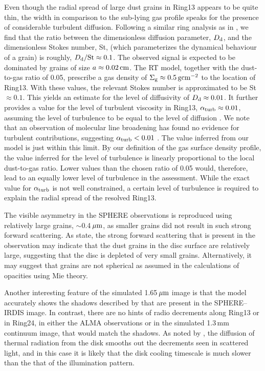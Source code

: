 \documentclass[fleqn,usenatbib,useAMS]{mnras}
\begin{document}
Even though the radial spread of large dust grains in Ring13 appears to be quite thin, the width in comparison to the sub-lying gas profile speaks for the presence of considerable turbulent diffusion. Following a similar ring analysis as in \citet{2018ApJ...869L..46D}, we find that the ratio between the dimensionless diffusion parameter, $D_{\rm d}$, and the dimensionless Stokes number, St, (which parameterizes the dynamical behaviour of a grain) is roughly, $D_{\rm d}/{\rm St}\approx 0.1$. The observed signal is expected to be dominated by grains of size $a\approx 0.02\,{\rm cm}$. The RT model, together with the dust-to-gas ratio of 0.05, prescribe a gas density of $\Sigma_{\rm g} \approx 0.5\,{\rm g}{\rm cm}^{-2}$ to the location of Ring13. With these values, the relevant Stokes number is approximated to be St$\approx 0.1$. This yields an estimate for the level of diffusivity of $D_{\rm d}\approx 0.01$. It further provides a value for the level of turbulent viscosity in Ring13, $\alpha_{\rm turb}\approx 0.01$, assuming the level of turbulence to be equal to the level of diffusion \citep{2007Icar..192..588Y}. We note that an observation of molecular line broadening has found no evidence for turbulent contributions, suggesting $\alpha_{\rm turb}<0.01$ \citep{Flaherty_2020}. The value inferred from our model is just within this limit. By our definition of the gas surface density profile, the value inferred for the level of turbulence is linearly proportional to the local dust-to-gas ratio. Lower values than the chosen ratio of 0.05 would, therefore, lead to an equally lower level of turbulence in the assessment. While the exact value for $\alpha_{\rm turb}$ is not well constrained, a certain level of turbulence is required to explain the radial spread of the resolved Ring13.

The visible asymmetry in the SPHERE observations is reproduced using relatively large grains, $\sim$0.4\,$\hbox{$\mu$m}$, as smaller grains did not result in such strong forward scattering. As \citet{refId0} state, the strong forward scattering that is present in the observation may indicate that the dust grains in the disc surface are relatively large, suggesting that the disc is depleted of very small grains. Alternatively, it may suggest that grains are not spherical as assumed in the calculations of opacities using Mie theory. 

Another interesting feature of the simulated 1.65\,$\hbox{$\mu$m}$ image is that the model accurately shows the shadows described by \citet{dOrazi} that are present in the SPHERE–IRDIS image. In contrast, there are no hints of radio decrements along Ring13 or in Ring24, in either the ALMA observations or in the simulated 1.3\,mm continuum image, that would match the shadows. As noted by \citet{Casassus2019MNRAS.486L..58C}, the diffusion of thermal radiation from the disk smooths out the decrements seen in scattered light, and in this case it is likely that the disk cooling timescale is much slower than the that of the illumination pattern.
\end{document}
